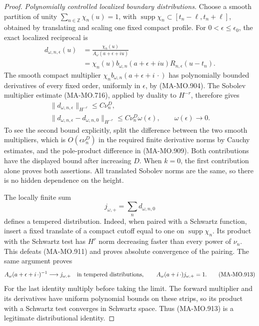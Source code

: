 \begin{proof}
\emph{Polynomially controlled localized boundary distributions.}
Choose a smooth partition of unity
\(\sum_{n\in\mathbb Z}\chi_n(u)=1\), with
\(\operatorname{supp}\chi_n\subset
[t_n-\ell,t_n+\ell]\), obtained by translating
and scaling one fixed compact profile.
For \(0<\epsilon\le\epsilon_0\), the exact
localized reciprocal is
\[
 \begin{aligned}
 d_{\omega,n,\epsilon}(u)
   &=\frac{\chi_n(u)}{A_\omega(a+\epsilon+iu)}\\
   &=\chi_n(u)b_{\omega,n}(a+\epsilon+iu)
                                  R_{n,\epsilon}(u-t_n).
 \end{aligned}
 \tag{MA-MO.910}
\]
The smooth compact multiplier
\(\chi_n b_{\omega,n}(a+\epsilon+i\,\cdot)\)
has polynomially bounded derivatives of
every fixed order, uniformly in \(\epsilon\),
by (MA-MO.904). The Sobolev multiplier
estimate (MA-MO.716), applied by duality
to \(H^{-r}\), therefore gives
\[
 \begin{gathered}
 \|d_{\omega,n,\epsilon}\|_{H^{-r}}
                                \le C\nu_n^D,\\
 \|d_{\omega,n,\epsilon}-d_{\omega,n,0}\|_{H^{-r}}
                    \le C\nu_n^D\omega(\epsilon),\qquad
                         \omega(\epsilon)\longrightarrow0 .
 \end{gathered}
 \tag{MA-MO.911}
\]
To see the second bound explicitly, split the
difference between the two smooth multipliers,
which is \(O(\epsilon\nu_n^D)\) in the
required finite derivative norms by Cauchy
estimates, and the pole-product difference
in (MA-MO.909). Both contributions have
the displayed bound after increasing \(D\).
When \(k=0\), the first contribution alone
proves both assertions. All translated
Sobolev norms are the same, so there is
no hidden dependence on the height.

The locally finite sum
\[
                         j_{\omega,+}=\sum_n d_{\omega,n,0}
 \tag{MA-MO.912}
\]
defines a tempered distribution. Indeed,
when paired with a Schwartz function,
insert a fixed translate of a compact
cutoff equal to one on
\(\operatorname{supp}\chi_n\). Its product
with the Schwartz test has \(H^r\) norm
decreasing faster than every power of
\(\nu_n\). This defeats (MA-MO.911)
and proves absolute convergence of the
pairing. The same argument proves
\[
 A_\omega(a+\epsilon+i\,\cdot)^{-1}
       \longrightarrow j_{\omega,+}
                  \quad\hbox{in tempered distributions},\qquad
 A_\omega(a+i\,\cdot)j_{\omega,+}=1 .
 \tag{MA-MO.913}
\]
For the last identity multiply before
taking the limit. The forward multiplier
and its derivatives have uniform polynomial
bounds on these strips, so its product
with a Schwartz test converges in Schwartz
space. Thus (MA-MO.913) is a legitimate
distributional identity.


\end{proof}
